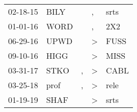 \begin{supertabular}{p{0.07\textwidth}p{0.06\textwidth}p{0.02\textwidth}p{0.02\textwidth}p{0.06\textwidth}}
          02-18-15\textsuperscript{} &           BILY\textsuperscript{} &                  &                , &           srts\textsuperscript{} \\
          01-01-16\textsuperscript{} &           WORD\textsuperscript{} &                  &                , &            2X2\textsuperscript{} \\
          06-29-16\textsuperscript{} &           UPWD\textsuperscript{} &                  &     \textgreater &           FUSS\textsuperscript{} \\
          09-10-16\textsuperscript{} &           HIGG\textsuperscript{} &                  &     \textgreater &           MISS\textsuperscript{} \\
          03-31-17\textsuperscript{} &           STKO\textsuperscript{} &                , &     \textgreater &           CABL\textsuperscript{} \\
          03-25-18\textsuperscript{} &           prof\textsuperscript{} &                , &     \textgreater &           rele\textsuperscript{} \\
          01-19-19\textsuperscript{} &           SHAF\textsuperscript{} &                  &     \textgreater &           srts\textsuperscript{} \\
\end{supertabular}
